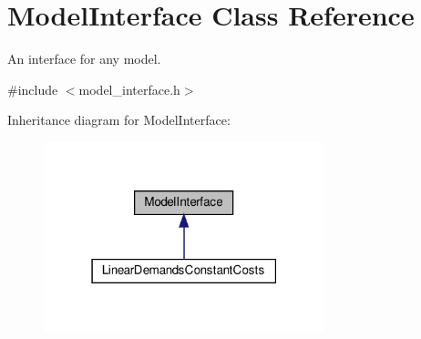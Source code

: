 \hypertarget{classModelInterface}{}\section{Model\+Interface Class Reference}
\label{classModelInterface}


An interface for any model.  




{\ttfamily \#include $<$model\+\_\+interface.\+h$>$}



Inheritance diagram for Model\+Interface\+:
\nopagebreak
\begin{figure}[H]
\begin{center}
\leavevmode
\includegraphics[width=231pt]{classModelInterface__inherit__graph}
\end{center}
\end{figure}
